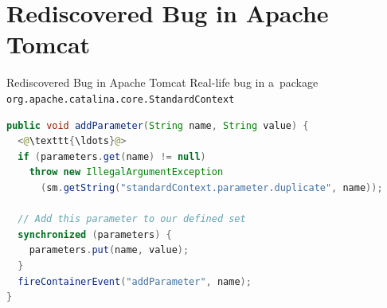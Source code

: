 \documentclass[10pt, xcolor=pdflatex, hyperref={unicode}, aspectratio=169]{beamer}
\begin{document}
\section{Rediscovered Bug in Apache Tomcat}
\begin{frame}[fragile]{Rediscovered Bug in Apache Tomcat}
    \alert{Real-life bug} in a~package \texttt{org.apache.catalina.core.StandardContext}

    \medskip

\begin{lstlisting}[language=java, morekeywords={String}]
public void addParameter(String name, String value) {
  <@\texttt{\ldots}@>
  if (parameters.get(name) != null)
    throw new IllegalArgumentException
      (sm.getString("standardContext.parameter.duplicate", name));

  // Add this parameter to our defined set
  synchronized (parameters) {
    parameters.put(name, value);
  }
  fireContainerEvent("addParameter", name);
}
\end{lstlisting}
\end{frame}


\end{document}
